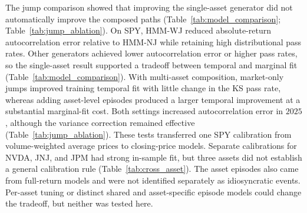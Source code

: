 The jump comparison showed that improving the single-asset generator
did not automatically improve the composed paths
(Table~\ref{tab:model_comparison}; Table~\ref{tab:jump_ablation}). On SPY, HMM-WJ
reduced absolute-return autocorrelation error relative to HMM-NJ while
retaining high distributional pass rates. Other generators achieved
lower autocorrelation error or higher pass rates, so the single-asset
result supported a tradeoff between temporal and marginal fit
(Table~\ref{tab:model_comparison}). With multi-asset composition,
market-only jumps improved training temporal fit with little change
in the KS pass rate, whereas adding asset-level episodes produced a
larger temporal improvement at a substantial marginal-fit cost.
Both settings increased autocorrelation error in $2025$, although
the variance correction remained effective
(Table~\ref{tab:jump_ablation}). These tests transferred one SPY
calibration from volume-weighted average prices to closing-price
models. Separate calibrations for NVDA, JNJ, and JPM had strong
in-sample fit, but three assets did not establish a general calibration
rule (Table~\ref{tab:cross_asset}). The asset episodes also came from
full-return models and were not identified separately as idiosyncratic
events. Per-asset tuning or distinct shared and asset-specific episode
models could change the tradeoff, but neither was tested here.

